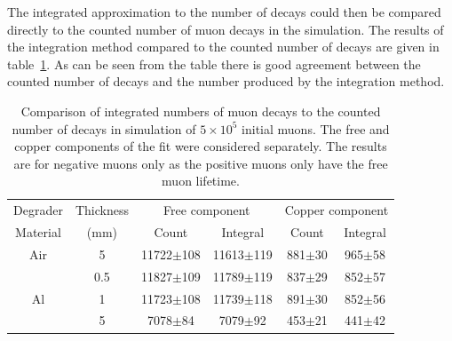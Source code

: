 The integrated approximation to the number of decays could then be compared directly to the counted number of muon decays in the simulation. The results of the integration method compared to the counted number of decays are given in table~\ref{tab:sim_counts_vs_integrals}. As can be seen from the table there is good agreement between the counted number of decays and the number produced by the integration method. 
 \begin{table}
  \begin{center}
  \begin{tabular}{c | c | c | c | c | c}
    Degrader  & Thickness  &  \multicolumn{2}{c|}{Free component}    &  \multicolumn{2}{c}{Copper component}      \\ 
    Material  &    (mm)    &    Count           & Integral           &    Count        &  Integral      \\ 
    \hline
    Air       &      5     &  11722\(\pm\)108   &  11613\(\pm\)119   &  881\(\pm\)30   &     965\(\pm\)58      \\ 
    \hline
    \multirow{4}{*}{Al} 
              &    0.5     &  11827\(\pm\)109   &  11789\(\pm\)119   &  837\(\pm\)29   &     852\(\pm\)57      \\ 
              &      1     &  11723\(\pm\)108   &  11739\(\pm\)118   &  891\(\pm\)30   &     852\(\pm\)56      \\ 
              &      5     &   7078\(\pm\)84    &   7079\(\pm\)92    &  453\(\pm\)21   &      441\(\pm\)42     \\ 
    
  \end{tabular}
  \end{center}
  \caption{Comparison of integrated numbers of muon decays to the counted number of decays in simulation of \(5\times10^5\) initial muons. The free and copper components of the fit were considered separately. The results are for negative muons only as the positive muons only have the free muon lifetime.}
  \label{tab:sim_counts_vs_integrals}
\end{table}


